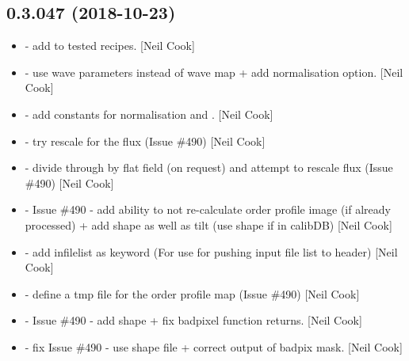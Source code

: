 \documentclass[a4paper,10pt,english]{report}
\begin{document}
\subsection{0.3.047 (2018-10-23)}
\label{\detokenize{misc/changelog:id285}}\begin{itemize}
\item {} 
 - add  to tested recipes. {[}Neil Cook{]}

\item {} 
 - use wave parameters instead of wave map +
add normalisation option. {[}Neil Cook{]}

\item {} 
 - add constants for normalisation and
. {[}Neil Cook{]}

\item {} 
 - try rescale for the flux (Issue \#490) {[}Neil
Cook{]}

\item {} 
 - divide through by flat field (on request) and
attempt to rescale flux (Issue \#490) {[}Neil Cook{]}

\item {} 
 - Issue \#490 - add ability to not re-calculate
order profile image (if already processed) + add shape as well as tilt
(use shape if in calibDB) {[}Neil Cook{]}

\item {} 
 - add infilelist as keyword (For use for pushing
input file list to header) {[}Neil Cook{]}

\item {} 
 - define a tmp file for the order profile map (Issue
\#490) {[}Neil Cook{]}

\item {} 
 - Issue \#490 - add shape + fix badpixel function
returns. {[}Neil Cook{]}

\item {} 
 - fix Issue \#490 - use shape file + correct
output of badpix mask. {[}Neil Cook{]}

\end{itemize}
\end{document}
